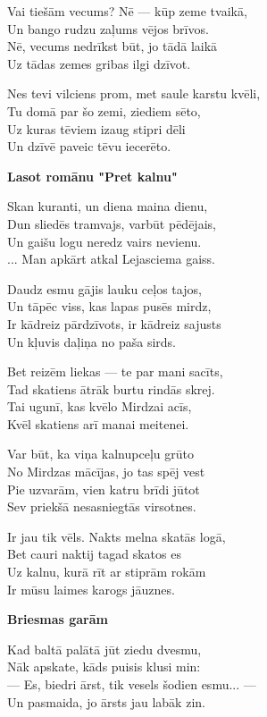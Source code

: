 \documentclass[11pt]{article}
\begin{document}
{Vai tiešām vecums? Nē --- kūp zeme tvaikā,\\
Un bango rudzu zaļums vējos brīvos.\\
Nē, vecums nedrīkst būt, jo tādā laikā\\
Uz tādas zemes gribas ilgi dzīvot.

Nes tevi vilciens prom, met saule karstu kvēli,\\
Tu domā par šo zemi, ziediem sēto,\\
Uz kuras tēviem izaug stipri dēli\\
Un dzīvē paveic tēvu iecerēto.

\newpage

{\bf Lasot romānu "Pret kalnu"}

Skan kuranti, un diena maina dienu,\\
Dun sliedēs tramvajs, varbūt pēdējais,\\
Un gaišu logu neredz vairs nevienu.\\
... Man apkārt atkal Lejasciema gaiss.

Daudz esmu gājis lauku ceļos tajos,\\
Un tāpēc viss, kas lapas pusēs mirdz,\\
Ir kādreiz pārdzīvots, ir kādreiz sajusts\\
Un kļuvis daļiņa no paša sirds.

Bet reizēm liekas --- te par mani sacīts,\\
Tad skatiens ātrāk burtu rindās skrej.\\
Tai ugunī, kas kvēlo Mirdzai acīs,\\
Kvēl skatiens arī manai meitenei.

Var būt, ka viņa kalnupceļu grūto\\
No Mirdzas mācījas, jo tas spēj vest\\
Pie uzvarām, vien katru brīdi jūtot\\
Sev priekšā nesasniegtās virsotnes.

Ir jau tik vēls. Nakts melna skatās logā,\\
Bet cauri naktij tagad skatos es\\
Uz kalnu, kurā rīt ar stiprām rokām\\
Ir mūsu laimes karogs jāuznes.

\newpage

{\bf Briesmas garām}

Kad baltā palātā jūt ziedu dvesmu,\\
Nāk apskate, kāds puisis klusi min:\\
--- Es, biedri ārst, tik vesels šodien esmu... ---\\
Un pasmaida, jo ārsts jau labāk zin.

}
\end{document}
